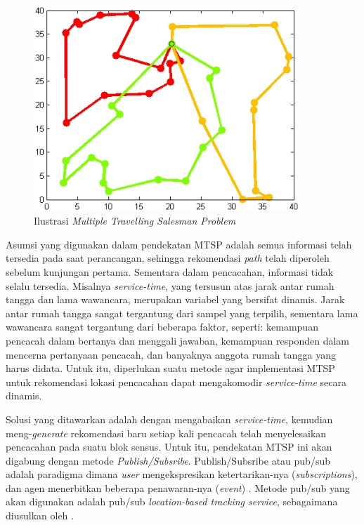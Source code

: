 \begin{figure}[h]
    \centering
    \includegraphics[width=10cm]{../../Resources/Images/mtsp}
    \caption{Ilustrasi \textit{Multiple Travelling Salesman Problem}}
    \label{fig:mtsp-ilustration}
\end{figure}


Asumsi yang digunakan dalam pendekatan MTSP adalah semua informasi telah tersedia pada saat perancangan, sehingga rekomendasi \textit{path} telah diperoleh sebelum kunjungan pertama. Sementara dalam pencacahan, informasi tidak selalu tersedia. Misalnya \textit{service-time}, yang tersusun atas jarak antar rumah tangga dan lama wawancara, merupakan variabel yang bersifat dinamis. Jarak antar rumah tangga sangat tergantung dari sampel yang terpilih, sementara lama wawancara sangat tergantung dari beberapa faktor, seperti: kemampuan pencacah dalam bertanya dan menggali jawaban, kemampuan responden dalam mencerna pertanyaan pencacah, dan banyaknya anggota rumah tangga yang harus didata. Untuk itu, diperlukan suatu metode agar implementasi MTSP untuk rekomendasi lokasi pencacahan dapat mengakomodir \textit{service-time} secara dinamis.


Solusi yang ditawarkan adalah dengan mengabaikan \textit{service-time}, kemudian meng-\textit{generate} rekomendasi baru setiap kali pencacah telah menyelesaikan pencacahan pada suatu blok sensus. Untuk itu, pendekatan MTSP ini akan digabung dengan metode \textit{Publish/Subsribe}. Publish/Subsribe atau pub/sub adalah paradigma dimana \textit{user} mengekspresikan ketertarikan-nya (\textit{subscriptions}), dan agen menerbitkan beberapa penawaran-nya (\textit{event}) \citep{fabret_filtering_2001}. Metode pub/sub yang akan digunakan adalah pub/sub \textit{location-based tracking service}, sebagaimana diusulkan oleh \citep{chen_efficient_2003}.


